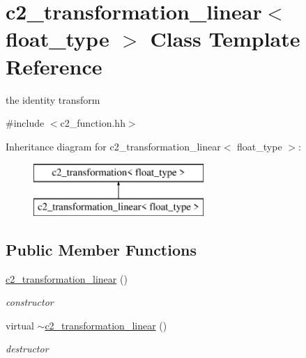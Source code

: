\hypertarget{classc2__transformation__linear}{\section{c2\-\_\-transformation\-\_\-linear$<$ float\-\_\-type $>$ Class Template Reference}
\label{classc2__transformation__linear}
}


the identity transform  




{\ttfamily \#include $<$c2\-\_\-function.\-hh$>$}

Inheritance diagram for c2\-\_\-transformation\-\_\-linear$<$ float\-\_\-type $>$\-:\begin{figure}[H]
\begin{center}
\leavevmode
\includegraphics[height=2.000000cm]{classc2__transformation__linear}
\end{center}
\end{figure}
\subsection*{Public Member Functions}
\begin{DoxyCompactItemize}
\item 
\hypertarget{classc2__transformation__linear_ac3ea2dc8112026ab912c1d40546b5493}{\hyperlink{classc2__transformation__linear_ac3ea2dc8112026ab912c1d40546b5493}{c2\-\_\-transformation\-\_\-linear} ()}\label{classc2__transformation__linear_ac3ea2dc8112026ab912c1d40546b5493}

\begin{DoxyCompactList}\small\item\em constructor \end{DoxyCompactList}\item 
\hypertarget{classc2__transformation__linear_ad53dc59cddc116f38047c8c8f1d35760}{virtual \hyperlink{classc2__transformation__linear_ad53dc59cddc116f38047c8c8f1d35760}{$\sim$c2\-\_\-transformation\-\_\-linear} ()}\label{classc2__transformation__linear_ad53dc59cddc116f38047c8c8f1d35760}

\begin{DoxyCompactList}\small\item\em destructor \end{DoxyCompactList}\end{DoxyCompactItemize}
